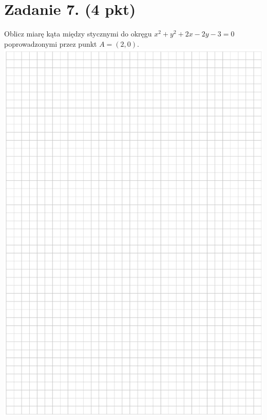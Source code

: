 \documentclass[10pt]{article}
\begin{document}
\section*{Zadanie 7. (4 pkt)}
Oblicz miarę kąta między stycznymi do okręgu \(x^{2}+y^{2}+2 x-2 y-3=0\) poprowadzonymi przez punkt \(A=(2,0)\).\\
\includegraphics[max width=\textwidth, center]{2024_11_21_b36d8cbb94edb763da2cg-10}\\
\end{document}
